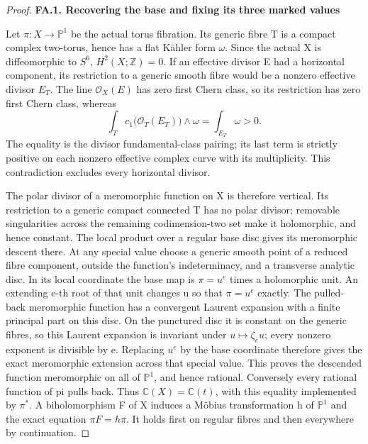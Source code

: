 \begin{proof}
\par

\medskip\noindent\textbf{FA.1. Recovering the base and fixing its three marked values}

\par\nobreak

Let \(\pi:X\to\mathbb P^1\) be the actual torus fibration. Its generic fibre T is a
compact complex two-torus, hence has a flat Kähler form \(\omega\). Since the
actual X is diffeomorphic to \(S^6\), \(H^2(X;\mathbb Z)=0\). If an effective divisor E
had a horizontal component, its restriction to a generic smooth fibre
would be a nonzero effective divisor \(E_T\). The line \(\mathcal O_X(E)\) has zero first
Chern class, so its restriction has zero first Chern class, whereas
\[
 \int_T c_1\bigl(\mathcal O_T(E_T)\bigr)\wedge\omega
                =\int_{E_T}\omega>0.                    \tag{FA.1}
\]
The equality is the divisor fundamental-class pairing; its last term is
strictly positive on each nonzero effective complex curve with its
multiplicity. This contradiction excludes every horizontal divisor.

The polar divisor of a meromorphic function on X is therefore vertical.
Its restriction to a generic compact connected T has no polar divisor;
removable singularities across the remaining codimension-two set make it
holomorphic, and hence constant. The local product over a regular base disc gives its meromorphic
descent there. At any special value choose a generic smooth point of a
reduced fibre component, outside the function's indeterminacy, and a
transverse analytic disc. In its local coordinate the base map is
\(\pi=u^e\) times a holomorphic unit. An extending e-th root of that unit
changes u so that \(\pi=u^e\) exactly. The pulled-back meromorphic function
has a convergent Laurent expansion with a finite principal part on
this disc. On the punctured disc it is constant on the generic fibres,
so this Laurent expansion is invariant under \(u\mapsto\zeta_e u\); every
nonzero exponent is divisible by e. Replacing \(u^e\) by the base
coordinate therefore gives the exact meromorphic extension across
that special value. This proves the descended function meromorphic
on all of \(\mathbb P^1\), and hence rational. Conversely every rational function
of pi pulls back. Thus \(\mathbb C(X)=\mathbb C(t)\), with this equality
implemented by \(\pi^*\). A biholomorphism F of X induces a Möbius transformation
h of \(\mathbb P^1\) and the exact equation \(\pi F=h\pi\). It holds first on regular fibres
and then everywhere by continuation.


\end{proof}
